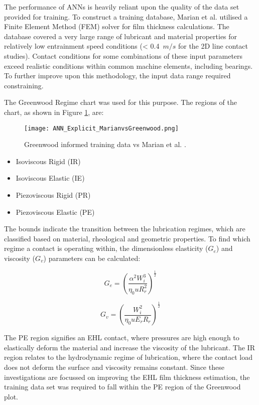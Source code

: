 The performance of ANNs is heavily reliant upon the quality of the data set provided for training. To construct a training database, Marian et al. \cite{Marian2022} utilised a Finite Element Method (FEM) solver for film thickness calculations. The database covered a very large range of lubricant and material properties for relatively low entrainment speed conditions (< 0.4~$m/s$ for the 2D line contact studies). Contact conditions for some combinations of these input parameters exceed realistic conditions within common machine elements, including bearings. To further improve upon this methodology, the input data range required constraining.

The Greenwood Regime chart \cite{Johnson1970} was used for this purpose. The regions of the chart, as shown in Figure \ref{Greenwood informed training data vs Marian et al.}, are:

\begin{figure}
	\centering  
	\texttt{[image: ANN\_Explicit\_MarianvsGreenwood.png]}
	\caption[Greenwood informed training data vs Marian et al.]{Greenwood informed training data vs Marian et al. \cite{Marian2022}.}
	\label{Greenwood informed training data vs Marian et al.}
\end{figure} 

\begin{itemize}
	\item Isoviscous Rigid (IR)
	\item Isoviscous Elastic (IE)
	\item Piezoviscous Rigid (PR)
	\item Piezoviscous Elastic (PE)
\end{itemize}

The bounds indicate the transition between the lubrication regimes, which are classified based on material, rheological and geometric properties. To find which regime a contact is operating within, the dimensionless elasticity ($G_e$) and viscosity ($G_v$) parameters can be calculated:

\begin{equation}\label{G_e}
	G_e=\left(\frac{\alpha^2 W_i^3}{\eta_0 u R_r^2}\right)^{\frac{1}{2}}
\end{equation}

\begin{equation}\label{G_v}
	G_v=\left(\frac{W_i^2}{\eta_0 u E_r R_r}\right)^{\frac{1}{2}}
\end{equation}

The PE region signifies an EHL contact, where pressures are high enough to elastically deform the material and increase the viscosity of the lubricant. The IR region relates to the hydrodynamic regime of lubrication, where the contact load does not deform the surface and viscosity remains constant. Since these investigations are focussed on improving the EHL film thickness estimation, the training data set was required to fall within the PE region of the Greenwood plot. 

